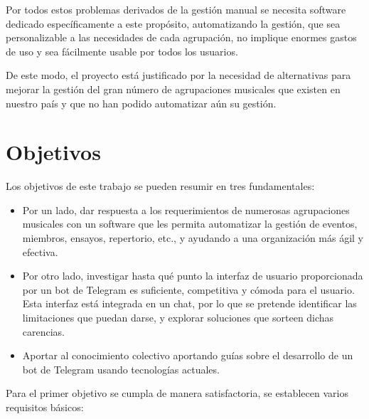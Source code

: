 Por todos estos problemas derivados de la gestión manual se necesita software dedicado específicamente a este propósito, automatizando la gestión, que sea personalizable a las necesidades de cada agrupación, no implique enormes gastos de uso y sea fácilmente usable por todos los usuarios.

De este modo, el proyecto está justificado por la necesidad de alternativas para mejorar la gestión del gran número de agrupaciones musicales que existen en nuestro país y que no han podido automatizar aún su gestión.

\section{Objetivos}


Los objetivos de este trabajo se pueden resumir en tres fundamentales:

\begin{itemize}
    \item Por un lado, dar respuesta a los requerimientos de numerosas agrupaciones musicales con un software que les permita automatizar la gestión de eventos, miembros, ensayos, repertorio, etc., y ayudando a una organización más ágil y efectiva.
    \item Por otro lado, investigar hasta qué punto la interfaz de usuario proporcionada por un bot de Telegram es suficiente, competitiva y cómoda para el usuario. Esta interfaz está integrada en un chat, por lo que se pretende identificar las limitaciones que puedan darse, y explorar soluciones que sorteen dichas carencias.
    \item Aportar al conocimiento colectivo aportando guías sobre el desarrollo de un bot de Telegram usando tecnologías actuales.
\end{itemize}

Para el primer objetivo se cumpla de manera satisfactoria, se establecen varios requisitos básicos:

